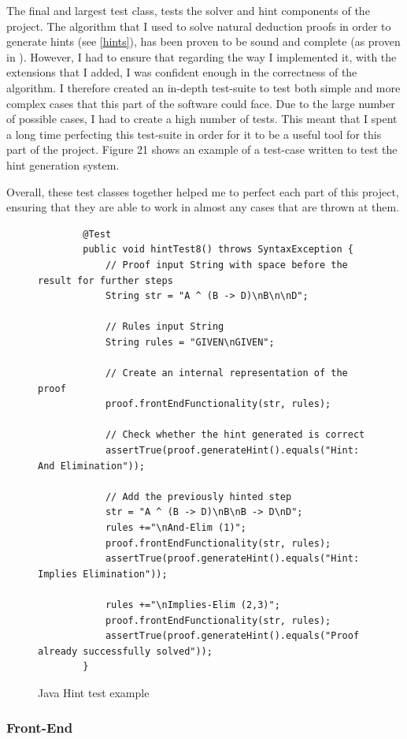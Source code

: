 The final and largest test class, tests the solver and hint components of the project. The algorithm that I used to solve natural deduction proofs in order to generate hints (see \ref{hints}), has been proven to be sound and complete (as proven in \cite{ndAlgo}). However, I had to ensure that regarding the way I implemented it, with the extensions that I added, I was confident enough in the correctness of the algorithm. I therefore created an in-depth test-suite to test both simple and more complex cases that this part of the software could face. Due to the large number of possible cases, I had to create a high number of tests. This meant that I spent a long time perfecting this test-suite in order for it to be a useful tool for this part of the project. Figure 21 shows an example of a test-case written to test the hint generation system. 

Overall, these test classes together helped me to perfect each part of this project, ensuring that they are able to work in almost any cases that are thrown at them.
\pagebreak

\begin{figure}[!ht]
	\begin{lstlisting}
		@Test
		public void hintTest8() throws SyntaxException {
			// Proof input String with space before the result for further steps
			String str = "A ^ (B -> D)\nB\n\nD";
			
			// Rules input String
			String rules = "GIVEN\nGIVEN";

			// Create an internal representation of the proof
			proof.frontEndFunctionality(str, rules);

			// Check whether the hint generated is correct
			assertTrue(proof.generateHint().equals("Hint: And Elimination"));

			// Add the previously hinted step
			str = "A ^ (B -> D)\nB\nB -> D\nD";
			rules +="\nAnd-Elim (1)";
			proof.frontEndFunctionality(str, rules);
			assertTrue(proof.generateHint().equals("Hint: Implies Elimination"));
		
			rules +="\nImplies-Elim (2,3)";
			proof.frontEndFunctionality(str, rules);
			assertTrue(proof.generateHint().equals("Proof already successfully solved"));
		}
\end{lstlisting}
\caption{Java Hint test example}
\end{figure}


\subsubsection{Front-End}

